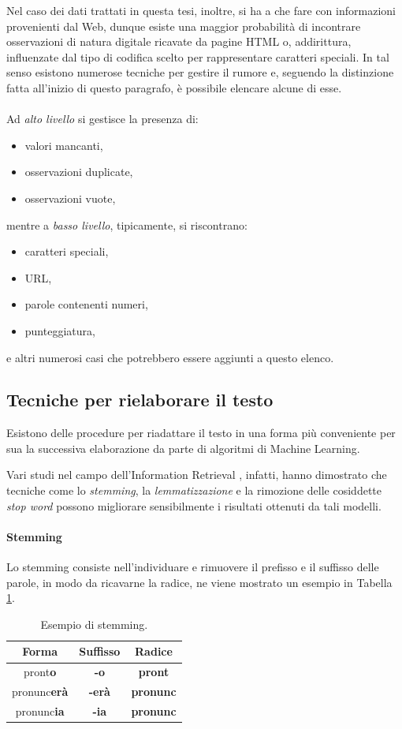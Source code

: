 \documentclass[12pt]{report}
\theoremstyle{definition}
\begin{document}
Nel caso dei dati trattati in questa tesi, inoltre, si ha a che fare con informazioni provenienti dal Web, dunque esiste una maggior probabilità di incontrare osservazioni di natura digitale ricavate da pagine HTML o, addirittura, influenzate dal tipo di codifica scelto per rappresentare caratteri speciali.
In tal senso esistono numerose tecniche per gestire il rumore e, seguendo la distinzione fatta all'inizio di questo paragrafo, è possibile elencare alcune di esse.
\\
\\
Ad \textit{alto livello} si gestisce la presenza di:
\begin{itemize}
    \item valori mancanti,
    \item osservazioni duplicate,
    \item osservazioni vuote,
\end{itemize}

mentre a \textit{basso livello}, tipicamente, si riscontrano:
\begin{itemize}
    \item caratteri speciali,
    \item URL,
    \item parole contenenti numeri,
    \item punteggiatura,
\end{itemize}

e altri numerosi casi che potrebbero essere aggiunti a questo elenco.
\subsection{Tecniche per rielaborare il testo}
Esistono delle procedure per riadattare il testo in una forma più conveniente per sua la successiva elaborazione da parte di algoritmi di Machine Learning.

Vari studi nel campo dell'Information Retrieval \cite{22}, infatti, hanno dimostrato che tecniche come lo \textit{stemming}, la \textit{lemmatizzazione} e la rimozione delle cosiddette \textit{stop word} possono migliorare sensibilmente i risultati ottenuti da tali modelli.

\paragraph{Stemming} Lo stemming consiste nell'individuare e rimuovere il prefisso e il suffisso delle parole, in modo da ricavarne la radice, ne viene mostrato un esempio in Tabella \ref{stemming}.
\begin{table}[!h]
\centering
 \begin{tabular}{|c|c|c|} 
 \hline 
 \textbf{Forma} & \textbf{Suffisso} & \textbf{Radice}
\\ [0.5ex] 
\hline
pront\textbf{o} & \textbf{-o} & \textbf{pront} \\
pronunc\textbf{erà} & \textbf{-erà} & \textbf{pronunc} \\
pronunc\textbf{ia} & \textbf{-ia} & \textbf{pronunc} \\
 \hline
\end{tabular}
\caption{Esempio di stemming.}
\label{stemming}
\end{table}
\end{document}
